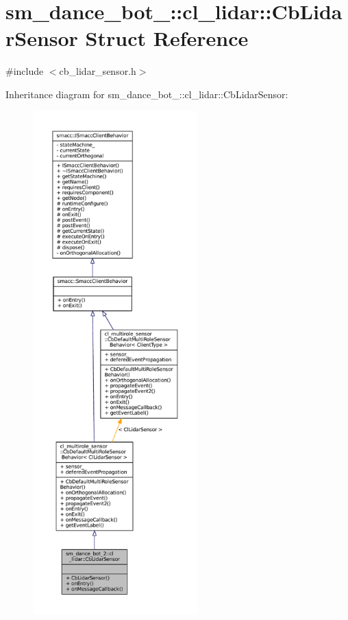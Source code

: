 \hypertarget{structsm__dance__bot__2_1_1cl__lidar_1_1CbLidarSensor}{}\section{sm\+\_\+dance\+\_\+bot\+\_\+:\+:cl\+\_\+lidar\+:\+:Cb\+Lidar\+Sensor Struct Reference}
\label{structsm__dance__bot__2_1_1cl__lidar_1_1CbLidarSensor}


{\ttfamily \#include $<$cb\+\_\+lidar\+\_\+sensor.\+h$>$}



Inheritance diagram for sm\+\_\+dance\+\_\+bot\+\_\+:\+:cl\+\_\+lidar\+:\+:Cb\+Lidar\+Sensor\+:
\nopagebreak
\begin{figure}[H]
\begin{center}
\leavevmode
\includegraphics[height=550pt]{structsm__dance__bot__2_1_1cl__lidar_1_1CbLidarSensor__inherit__graph}
\end{center}
\end{figure}


